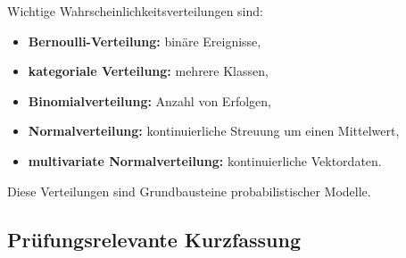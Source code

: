 \documentclass[11pt,a4paper]{scrartcl}
\begin{document}
\begin{answerbox}
    Wichtige Wahrscheinlichkeitsverteilungen sind:

    \begin{itemize}
        \item \textbf{Bernoulli-Verteilung:} binäre Ereignisse,
        \item \textbf{kategoriale Verteilung:} mehrere Klassen,
        \item \textbf{Binomialverteilung:} Anzahl von Erfolgen,
        \item \textbf{Normalverteilung:} kontinuierliche Streuung um einen Mittelwert,
        \item \textbf{multivariate Normalverteilung:} kontinuierliche Vektordaten.
    \end{itemize}

    Diese Verteilungen sind Grundbausteine probabilistischer Modelle.
\end{answerbox}

\subsection{Prüfungsrelevante Kurzfassung}
\end{document}
